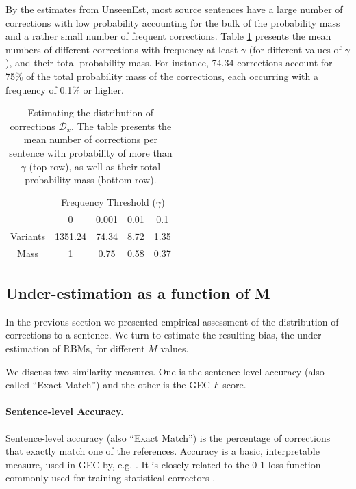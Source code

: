 \documentclass[letterpaper, 11pt]{article}
\begin{document}
By the estimates from {\sc UnseenEst}, most source sentences have a large number of
corrections with low probability accounting for the bulk of the probability mass
and a rather small number of frequent corrections.
Table \ref{tab:corrections_dist} presents the mean numbers of different corrections with frequency at least
$\gamma$ (for different values of $\gamma$), and their total probability mass.
For instance, 74.34 corrections account for 75\% of the total probability mass of the corrections, each
occurring with a frequency of 0.1\% or higher.

\begin{table}[h!]
	\vspace{-0.5cm}
  \centering
  \small
  \singlespacing
  \begin{tabular}{c|c|c|c|c|}
    & \multicolumn{4}{c|}{Frequency Threshold ($\gamma$)}\\ 
    & \multicolumn{1}{c}{0} & \multicolumn{1}{c}{0.001} & \multicolumn{1}{c}{0.01} & \multicolumn{1}{c|}{0.1}
    \\
    \hline
    Variants & 1351.24 & 74.34 & 8.72 & 1.35
    \\
    Mass & 1 & 0.75 & 0.58 & 0.37\\
    \hline
  \end{tabular}
  \caption{\label{tab:corrections_dist}
    Estimating the distribution of corrections $\mathcal{D}_x$.
    The table presents the mean number of corrections per sentence with probability of more than
    $\gamma$ (top row), as well as their total probability mass (bottom row).
  }
  \vspace{-0.5cm}
\end{table}
%
\subsection{Under-estimation as a function of M} \label{subsec:Assessment-values}
In the previous section we presented empirical assessment of the distribution of corrections to a sentence. We turn to estimate the resulting bias, the under-estimation of RBMs, for different $M$ values. 

We discuss two similarity measures. One is the sentence-level accuracy
(also called ``Exact Match'') and the other is the GEC $F$-score.

\paragraph{Sentence-level Accuracy.}
Sentence-level accuracy (also ``Exact Match'') is the percentage of corrections that
exactly match one of the references.
Accuracy is a basic, interpretable measure, used in GEC by, e.g. \cite{rozovskaya2010annotating}.
It is closely related to the 0-1 loss function commonly used
for training statistical correctors \cite{chodorow2012problems,rozovskaya2013joint}. 
\end{document}
